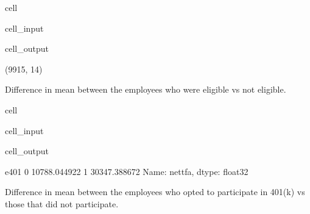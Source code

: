 \documentclass[letterpaper,10pt,english]{jupyterBook}
\begin{document}
\begin{sphinxuseclass}{cell}\begin{sphinxVerbatimInput}

\begin{sphinxuseclass}{cell_input}
\begin{sphinxVerbatim}[commandchars=\\\{\}]
\end{sphinxVerbatim}

\end{sphinxuseclass}\end{sphinxVerbatimInput}
\begin{sphinxVerbatimOutput}

\begin{sphinxuseclass}{cell_output}
\begin{sphinxVerbatim}[commandchars=\\\{\}]
(9915, 14)
\end{sphinxVerbatim}

\end{sphinxuseclass}\end{sphinxVerbatimOutput}

\end{sphinxuseclass}
\sphinxAtStartPar
Difference in mean between the employees who were eligible vs not eligible.

\begin{sphinxuseclass}{cell}\begin{sphinxVerbatimInput}

\begin{sphinxuseclass}{cell_input}
\begin{sphinxVerbatim}[commandchars=\\\{\}]
\PYG{p}{[}\PYG{p}{]}
\end{sphinxVerbatim}

\end{sphinxuseclass}\end{sphinxVerbatimInput}
\begin{sphinxVerbatimOutput}

\begin{sphinxuseclass}{cell_output}
\begin{sphinxVerbatim}[commandchars=\\\{\}]
e401
0    10788.044922
1    30347.388672
Name: net\PYGZus{}tfa, dtype: float32
\end{sphinxVerbatim}

\end{sphinxuseclass}\end{sphinxVerbatimOutput}

\end{sphinxuseclass}
\sphinxAtStartPar
Difference in mean between the employees who opted to participate in 401(k) vs those that did not participate.
\end{document}
